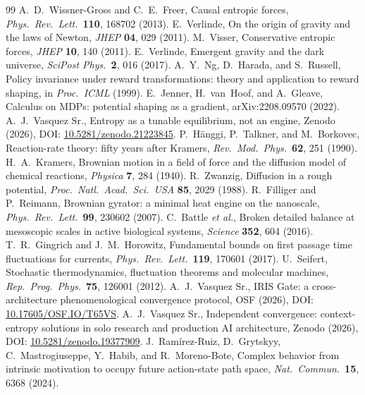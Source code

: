 \documentclass[11pt]{article}
\begin{document}
\begin{thebibliography}{99}\small
{} A.~D.~Wissner-Gross and C.~E.~Freer, Causal entropic forces, \emph{Phys.\ Rev.\ Lett.}\ \textbf{110}, 168702 (2013).
 E.~Verlinde, On the origin of gravity and the laws of Newton, \emph{JHEP} \textbf{04}, 029 (2011).
 M.~Visser, Conservative entropic forces, \emph{JHEP} \textbf{10}, 140 (2011).
 E.~Verlinde, Emergent gravity and the dark universe, \emph{SciPost Phys.}\ \textbf{2}, 016 (2017).
 A.~Y.~Ng, D.~Harada, and S.~Russell, Policy invariance under reward transformations: theory and application to reward shaping, in \emph{Proc.\ ICML} (1999).
 E.~Jenner, H.~van~Hoof, and A.~Gleave, Calculus on MDPs: potential shaping as a gradient, arXiv:2208.09570 (2022).
 A.~J.~Vasquez Sr., Entropy as a tunable equilibrium, not an engine, Zenodo (2026), DOI: \href{https://doi.org/10.5281/zenodo.21223845}{10.5281/zenodo.21223845}.
 P.~H\"anggi, P.~Talkner, and M.~Borkovec, Reaction-rate theory: fifty years after Kramers, \emph{Rev.\ Mod.\ Phys.}\ \textbf{62}, 251 (1990).
 H.~A.~Kramers, Brownian motion in a field of force and the diffusion model of chemical reactions, \emph{Physica} \textbf{7}, 284 (1940).
 R.~Zwanzig, Diffusion in a rough potential, \emph{Proc.\ Natl.\ Acad.\ Sci.\ USA} \textbf{85}, 2029 (1988).
 R.~Filliger and P.~Reimann, Brownian gyrator: a minimal heat engine on the nanoscale, \emph{Phys.\ Rev.\ Lett.}\ \textbf{99}, 230602 (2007).
 C.~Battle \emph{et al.}, Broken detailed balance at mesoscopic scales in active biological systems, \emph{Science} \textbf{352}, 604 (2016).
 T.~R.~Gingrich and J.~M.~Horowitz, Fundamental bounds on first passage time fluctuations for currents, \emph{Phys.\ Rev.\ Lett.}\ \textbf{119}, 170601 (2017).
 U.~Seifert, Stochastic thermodynamics, fluctuation theorems and molecular machines, \emph{Rep.\ Prog.\ Phys.}\ \textbf{75}, 126001 (2012).
 A.~J.~Vasquez Sr., IRIS Gate: a cross-architecture phenomenological convergence protocol, OSF (2026), DOI: \href{https://doi.org/10.17605/OSF.IO/T65VS}{10.17605/OSF.IO/T65VS}.
 A.~J.~Vasquez Sr., Independent convergence: context-entropy solutions in solo research and production AI architecture, Zenodo (2026), DOI: \href{https://doi.org/10.5281/zenodo.19377909}{10.5281/zenodo.19377909}.
 J.~Ram\'irez-Ruiz, D.~Grytskyy, C.~Mastrogiuseppe, Y.~Habib, and R.~Moreno-Bote, Complex behavior from intrinsic motivation to occupy future action-state path space, \emph{Nat.\ Commun.}\ \textbf{15}, 6368 (2024).
\end{thebibliography}
\end{document}
